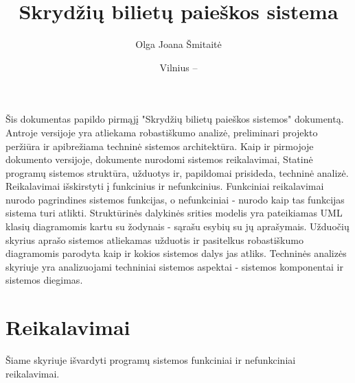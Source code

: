 \documentclass{VUMIFPSkursinis}
\title{Skrydžių bilietų paieškos sistema}
\author{Olga Joana Šmitaitė}
\date{Vilnius – \the\year}
\begin{document}
    \maketitle
      
        \tableofcontents
      
             Šis dokumentas papildo pirmąjį "Skrydžių bilietų paieškos sistemos" dokumentą. Antroje versijoje yra atliekama robastiškumo analizė, preliminari projekto peržiūra ir apibrežiama techninė sistemos architektūra. Kaip ir pirmojoje dokumento versijoje, dokumente nurodomi sistemos reikalavimai, Statinė programų sistemos struktūra, užduotys ir, papildomai prisideda, techninė analizė. Reikalavimai išskirstyti į funkcinius ir nefunkcinius. Funkciniai reikalavimai nurodo pagrindines sistemos funkcijas, o nefunkciniai - nurodo kaip tas funkcijas sistema turi atlikti. Struktūrinės dalykinės srities modelis yra pateikiamas UML klasių diagramomis kartu su žodynais - sąrašu esybių su jų aprašymais. Užduočių skyrius aprašo sistemos atliekamas užduotis ir pasitelkus robastiškumo diagramomis parodyta kaip ir kokios sistemos dalys jas atliks. Techninės analizės skyriuje yra analizuojami techniniai sistemos aspektai - sistemos komponentai ir sistemos diegimas.
 
        \section{Reikalavimai}
			Šiame skyriuje išvardyti programų sistemos funkciniai ir nefunkciniai reikalavimai.
\end{document}
